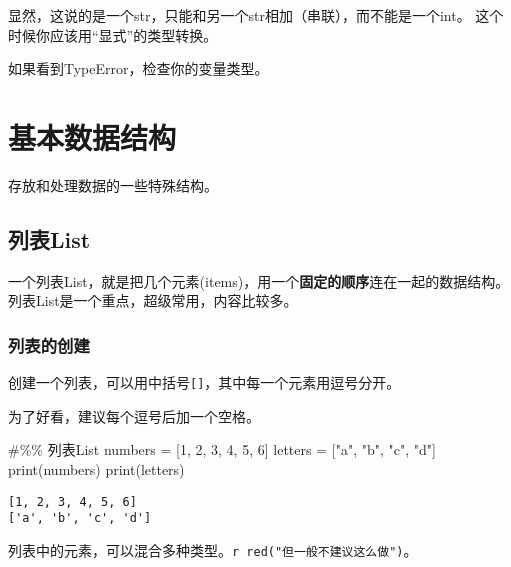 \documentclass[
  letterpaper,
  DIV=11,
  numbers=noendperiod]{scrreprt}
\newenvironment{Shaded}{\begin{snugshade}}{\end{snugshade}}
\newcommand{\BuiltInTok}[1]{\textcolor[rgb]{0.00,0.23,0.31}{#1}}
\newcommand{\CommentTok}[1]{\textcolor[rgb]{0.37,0.37,0.37}{#1}}
\newcommand{\DecValTok}[1]{\textcolor[rgb]{0.68,0.00,0.00}{#1}}
\newcommand{\NormalTok}[1]{\textcolor[rgb]{0.00,0.23,0.31}{#1}}
\newcommand{\OperatorTok}[1]{\textcolor[rgb]{0.37,0.37,0.37}{#1}}
\newcommand{\StringTok}[1]{\textcolor[rgb]{0.13,0.47,0.30}{#1}}
\begin{document}
显然，这说的是一个str，只能和另一个str相加（串联），而不能是一个int。
这个时候你应该用``显式''的类型转换。

如果看到TypeError，检查你的变量类型。

\hypertarget{ux57faux672cux6570ux636eux7ed3ux6784}{%
\chapter{基本数据结构}\label{ux57faux672cux6570ux636eux7ed3ux6784}}

存放和处理数据的一些特殊结构。

\hypertarget{ux5217ux8868list}{%
\section{列表List}\label{ux5217ux8868list}}

一个列表List，就是把几个元素(items)，用一个\textbf{固定的顺序}连在一起的数据结构。列表List是一个重点，超级常用，内容比较多。

\hypertarget{ux5217ux8868ux7684ux521bux5efa}{%
\subsection{列表的创建}\label{ux5217ux8868ux7684ux521bux5efa}}

创建一个列表，可以用中括号\texttt{{[}{]}}，其中每一个元素用逗号分开。

为了好看，建议每个逗号后加一个空格。

\begin{Shaded}
\begin{Highlighting}[]
\CommentTok{\#\%\% 列表List}
\NormalTok{numbers }\OperatorTok{=}\NormalTok{ [}\DecValTok{1}\NormalTok{, }\DecValTok{2}\NormalTok{, }\DecValTok{3}\NormalTok{, }\DecValTok{4}\NormalTok{, }\DecValTok{5}\NormalTok{, }\DecValTok{6}\NormalTok{]}
\NormalTok{letters }\OperatorTok{=}\NormalTok{ [}\StringTok{"a"}\NormalTok{, }\StringTok{"b"}\NormalTok{, }\StringTok{"c"}\NormalTok{, }\StringTok{"d"}\NormalTok{]}
\BuiltInTok{print}\NormalTok{(numbers)}
\BuiltInTok{print}\NormalTok{(letters)}
\end{Highlighting}
\end{Shaded}

\begin{verbatim}
[1, 2, 3, 4, 5, 6]
['a', 'b', 'c', 'd']
\end{verbatim}

列表中的元素，可以混合多种类型。\texttt{r\ red("但一般不建议这么做")}。
\end{document}
